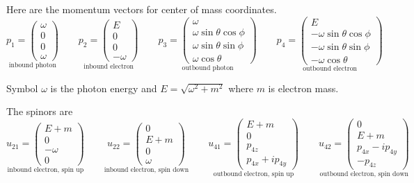 \documentclass[12pt]{article}
\begin{document}
\noindent
Here are the momentum vectors for center of mass coordinates.
\begin{equation*}
\underset{\text{inbound photon}}
{
p_1=\begin{pmatrix}\omega\\0\\0\\ \omega\end{pmatrix}
}
\qquad
\underset{\text{inbound electron}}
{
p_2=\begin{pmatrix}E\\0\\0\\-\omega\end{pmatrix}
}
\qquad
\underset{\text{outbound photon}}
{
p_3=\begin{pmatrix}
\omega\\
\omega\sin\theta\cos\phi\\
\omega\sin\theta\sin\phi\\
\omega\cos\theta
\end{pmatrix}
}
\qquad
\underset{\text{outbound electron}}
{
p_4=\begin{pmatrix}
E\\
-\omega\sin\theta\cos\phi\\
-\omega\sin\theta\sin\phi\\
-\omega\cos\theta
\end{pmatrix}
}
\end{equation*}

\noindent
Symbol $\omega$ is the photon energy and $E=\sqrt{\omega^2+m^2}$ where $m$ is electron mass.

\bigskip
\noindent
The spinors are
\begin{equation*}
\underset{\text{inbound electron, spin up}}
{
u_{21}=\begin{pmatrix}
E+m\\
0\\
-\omega\\
0
\end{pmatrix}
}
\qquad
\underset{\text{inbound electron, spin down}}
{
u_{22}=\begin{pmatrix}
0\\
E+m\\
0\\
\omega
\end{pmatrix}
}
\qquad
\underset{\text{outbound electron, spin up}}
{
u_{41}=\begin{pmatrix}
E+m\\
0\\
p_{4z}\\
p_{4x}+ip_{4y}
\end{pmatrix}
}
\qquad
\underset{\text{outbound electron, spin down}}
{
u_{42}=\begin{pmatrix}
0\\
E+m\\
p_{4x}-ip_{4y}\\
-p_{4z}
\end{pmatrix}
}
\end{equation*}
\end{document}
